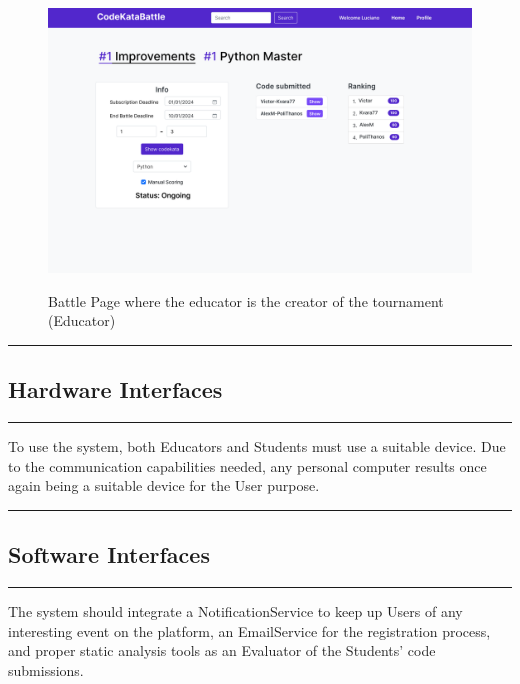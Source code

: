 \documentclass{Configuration_Files/Template}
\begin{document}
\begin{figure}[H]
\centering
\includegraphics[scale = 0.25]{Images/UI/BattlePage_EducatorCreator.png}\\
\caption{Battle Page where the educator is the creator of the tournament (Educator)}
\end{figure}








{\color{bluepoli}\rule{\linewidth}{0.1pt}}

\subsection{Hardware Interfaces}

{\color{bluepoli}\rule{\linewidth}{0.1pt}}

To use the system, both Educators and Students must use a suitable device. Due to the communication capabilities needed, any personal computer results once again being a suitable device for the User purpose. \\

{\color{bluepoli}\rule{\linewidth}{0.1pt}}

\subsection{Software Interfaces}

{\color{bluepoli}\rule{\linewidth}{0.1pt}}

The system should integrate a NotificationService to keep up Users of any interesting event on the platform, an EmailService for the registration process, and proper static analysis tools as an Evaluator of the Students' code submissions.\\
\end{document}
